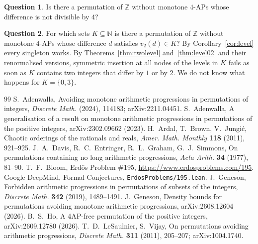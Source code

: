 \documentclass[11pt]{amsart}
\theoremstyle{definition}
\newtheorem{question}{Question}
\theoremstyle{remark}
\newcommand{\Z}{\mathbb{Z}}
\newcommand{\N}{\mathbb{N}}
\begin{document}
\begin{question}
Is there a permutation of $\Z$ without monotone $4$-APs whose difference is not divisible by $4$?
\end{question}

\begin{question}
For which sets $K\subseteq\N$ is there a permutation of $\Z$ without monotone $4$-APs whose difference $d$ satisfies $v_2(d)\in K$? By Corollary~\ref{cor:level} every singleton works. By Theorems~\ref{thm:twolevel} and~\ref{thm:level02} and their renormalised versions, symmetric insertion at all nodes of the levels in $K$ fails as soon as $K$ contains two integers that differ by $1$ or by $2$. We do not know what happens for $K=\{0,3\}$.
\end{question}

\begin{thebibliography}{99}
 S.~Adenwalla, Avoiding monotone arithmetic progressions in permutations of integers, \emph{Discrete Math.} (2024), 114183; arXiv:2211.04451.
 S.~Adenwalla, A generalisation of a result on monotone arithmetic progressions in permutations of the positive integers, arXiv:2302.09662 (2023).
 H.~Ardal, T.~Brown, V.~Jungi\'c, Chaotic orderings of the rationals and reals, \emph{Amer. Math. Monthly} \textbf{118} (2011), 921--925.
 J.~A.~Davis, R.~C.~Entringer, R.~L.~Graham, G.~J.~Simmons, On permutations containing no long arithmetic progressions, \emph{Acta Arith.} \textbf{34} (1977), 81--90.
 T.~F.~Bloom, Erd\H{o}s Problem \#195, \url{https://www.erdosproblems.com/195}.
 Google DeepMind, Formal Conjectures, \texttt{ErdosProblems/195.lean}.
 J.~Geneson, Forbidden arithmetic progressions in permutations of subsets of the integers, \emph{Discrete Math.} \textbf{342} (2019), 1489--1491.
 J.~Geneson, Density bounds for permutations avoiding monotone arithmetic progressions, arXiv:2608.12604 (2026).
 B.~S.~Ho, A 4AP-free permutation of the positive integers, arXiv:2609.12780 (2026).
 T.~D.~LeSaulnier, S.~Vijay, On permutations avoiding arithmetic progressions, \emph{Discrete Math.} \textbf{311} (2011), 205--207; arXiv:1004.1740.
\end{thebibliography}
\end{document}
